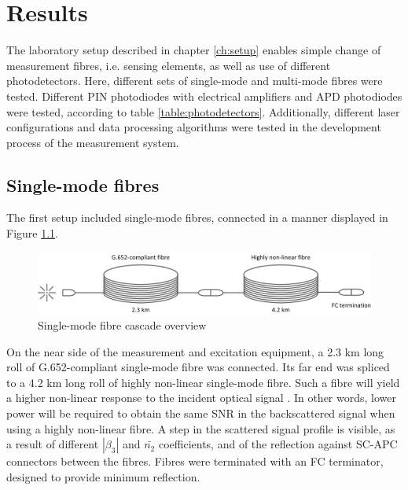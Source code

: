 \documentclass{standalone}
\begin{document}
\chapter{Results} \label{ch:results}
\setcounter{page}\thestranica


The laboratory setup described in chapter \ref{ch:setup} enables simple change of measurement fibres, i.e. sensing elements, as well as use of different photodetectors. Here, different sets of single-mode and multi-mode fibres were tested. Different PIN photodiodes with electrical amplifiers and APD photodiodes were tested, according to table \ref{table:photodetectors}. Additionally, different laser configurations and data processing algorithms were tested in the development process of the measurement system.

\section{Single-mode fibres}

The first setup included single-mode fibres, connected in a manner displayed in Figure \ref{fig:smf_cascade}.
\begin{figure}[h]
	\centering
	\includegraphics[width=\textwidth]{smf_cascade.png}
	\caption{Single-mode fibre cascade overview}
	\label{fig:smf_cascade}
\end{figure}
On the near side of the measurement and excitation equipment, a 2.3 km long roll of G.652-compliant single-mode fibre was connected. Its far end was spliced to a 4.2 km long roll of highly non-linear single-mode fibre. Such a fibre will yield a higher non-linear response to the incident optical signal \cite{Hiroishi2003}. In other words, lower power will be required to obtain the same SNR in the backscattered signal when using a highly non-linear fibre. A step in the scattered signal profile is visible, as a result of different $\left|\beta_3\right|$ and $\bar{n_2}$ coefficients, and of the reflection against SC-APC connectors between the fibres. Fibres were terminated with an FC terminator, designed to provide minimum reflection. \\
\end{document}
